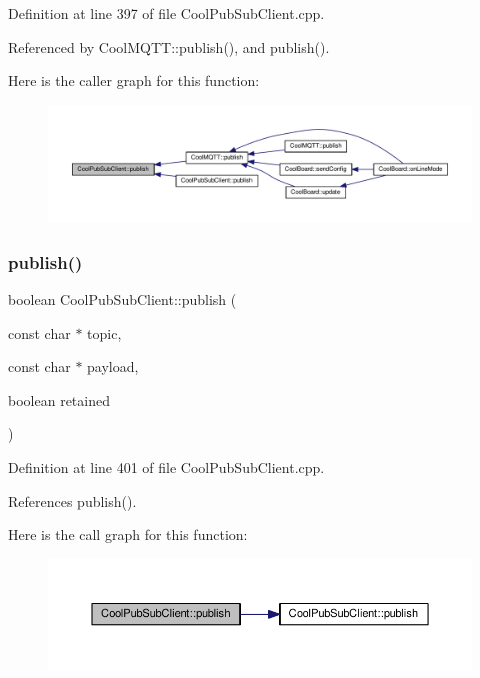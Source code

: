 Definition at line 397 of file Cool\+Pub\+Sub\+Client.\+cpp.



Referenced by Cool\+M\+Q\+T\+T\+::publish(), and publish().

Here is the caller graph for this function\+:
\nopagebreak
\begin{figure}[H]
\begin{center}
\leavevmode
\includegraphics[width=350pt]{d8/d4b/class_cool_pub_sub_client_ab6ad5fa2d3db8f91454027257f225a89_icgraph}
\end{center}
\end{figure}
\mbox{\label{class_cool_pub_sub_client_a0b01cef98af0b57d8da4df373e196448}} 
\subsubsection{\texorpdfstring{publish()}{publish()}\hspace{0.1cm}{\footnotesize\ttfamily [2/4]}}
{\footnotesize\ttfamily boolean Cool\+Pub\+Sub\+Client\+::publish (\begin{DoxyParamCaption}\item[{const char $\ast$}]{topic,  }\item[{const char $\ast$}]{payload,  }\item[{boolean}]{retained }\end{DoxyParamCaption})}



Definition at line 401 of file Cool\+Pub\+Sub\+Client.\+cpp.



References publish().

Here is the call graph for this function\+:
\nopagebreak
\begin{figure}[H]
\begin{center}
\leavevmode
\includegraphics[width=350pt]{d8/d4b/class_cool_pub_sub_client_a0b01cef98af0b57d8da4df373e196448_cgraph}
\end{center}
\end{figure}
\mbox{\label{class_cool_pub_sub_client_abf184c0968a6655b68b5fdfbbc0c87d1}} 
